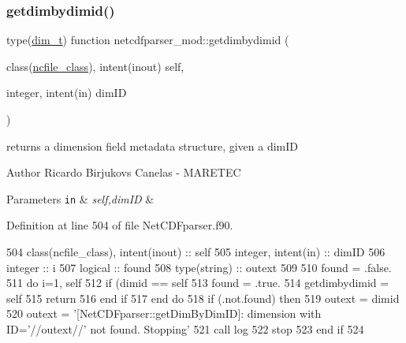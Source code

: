 \subsubsection{\texorpdfstring{getdimbydimid()}{getdimbydimid()}}
{\footnotesize\ttfamily type(\mbox{\hyperlink{structnetcdfparser__mod_1_1dim__t}{dim\+\_\+t}}) function netcdfparser\+\_\+mod\+::getdimbydimid (\begin{DoxyParamCaption}\item[{class(\mbox{\hyperlink{structnetcdfparser__mod_1_1ncfile__class}{ncfile\+\_\+class}}), intent(inout)}]{self,  }\item[{integer, intent(in)}]{dim\+ID }\end{DoxyParamCaption})\hspace{0.3cm}{\ttfamily [private]}}



returns a dimension field metadata structure, given a dim\+ID 

\begin{DoxyAuthor}{Author}
Ricardo Birjukovs Canelas -\/ M\+A\+R\+E\+T\+EC 
\end{DoxyAuthor}

\begin{DoxyParams}[1]{Parameters}
\mbox{\tt in}  & {\em self,dim\+ID} & \\
\hline
\end{DoxyParams}


Definition at line 504 of file Net\+C\+D\+Fparser.\+f90.


\begin{DoxyCode}
504     \textcolor{keywordtype}{class}(ncfile\_class), \textcolor{keywordtype}{intent(inout)} :: self
505     \textcolor{keywordtype}{integer}, \textcolor{keywordtype}{intent(in)} :: dimID
506     \textcolor{keywordtype}{integer} :: i
507     \textcolor{keywordtype}{logical} :: found
508     \textcolor{keywordtype}{type}(string) :: outext
509 
510     found = .false.
511     \textcolor{keywordflow}{do} i=1, self%
512         \textcolor{keywordflow}{if} (dimid == self%
513             found = .true.
514             getdimbydimid = self%
515             \textcolor{keywordflow}{return}
516 \textcolor{keywordflow}{        end if}
517 \textcolor{keywordflow}{    end do}
518     \textcolor{keywordflow}{if} (.not.found) \textcolor{keywordflow}{then}
519         outext = dimid
520         outext = \textcolor{stringliteral}{'[NetCDFparser::getDimByDimID]: dimension with ID='}//outext//\textcolor{stringliteral}{' not found. Stopping'}
521         \textcolor{keyword}{call }log%
522         stop
523 \textcolor{keywordflow}{    end if}
524 
\end{DoxyCode}
\mbox{\label{namespacenetcdfparser__mod_a57c39a4003778a6bf90cfd36b69380bc}} 
